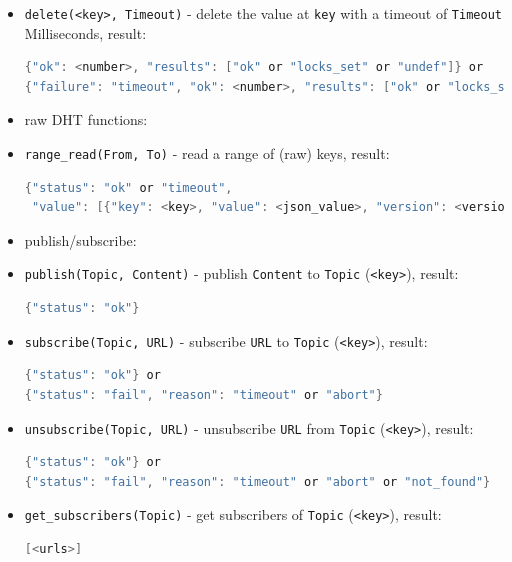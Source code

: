 \documentclass[a4paper]{scrreprt}
\newcommand{\code}[1]{\lstinline[basicstyle=\ttfamily]!#1!}
\begin{document}
\begin{itemize}
\begin{lstlisting}[language=java]
\end{lstlisting}
  \item \code{delete(<key>, Timeout)} - delete the value at \code{key} with a timeout of \code{Timeout} Milliseconds, result:
\begin{lstlisting}[language=java]
{"ok": <number>, "results": ["ok" or "locks_set" or "undef"]} or
{"failure": "timeout", "ok": <number>, "results": ["ok" or "locks_set" or "undef"]}
\end{lstlisting}
  \item[] \hspace{-1.7em}raw DHT functions:
  \item \code{range_read(From, To)} - read a range of (raw) keys, result:
\begin{lstlisting}[language=java]
{"status": "ok" or "timeout",
 "value": [{"key": <key>, "value": <json_value>, "version": <version>}]}
\end{lstlisting}
  \item[] \hspace{-1.7em}publish/subscribe:
  \item \code{publish(Topic, Content)} - publish \code{Content} to \code{Topic} (\code{<key>}), result:
\begin{lstlisting}[language=java]
{"status": "ok"}
\end{lstlisting}
  \item \code{subscribe(Topic, URL)} - subscribe \code{URL} to \code{Topic} (\code{<key>}), result:
\begin{lstlisting}[language=java]
{"status": "ok"} or
{"status": "fail", "reason": "timeout" or "abort"}
\end{lstlisting}
  \item \code{unsubscribe(Topic, URL)} - unsubscribe \code{URL} from \code{Topic} (\code{<key>}), result:
\begin{lstlisting}[language=java]
{"status": "ok"} or
{"status": "fail", "reason": "timeout" or "abort" or "not_found"}
\end{lstlisting}
  \item \code{get_subscribers(Topic)} - get subscribers of \code{Topic} (\code{<key>}), result:
\begin{lstlisting}[language=java]
[<urls>]
\end{lstlisting}
\end{itemize}
\end{document}
